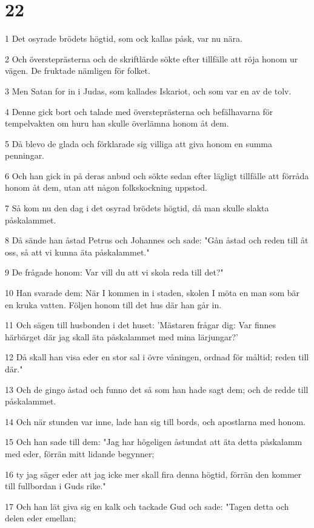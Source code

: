 \chapter{22}

\par 1 Det osyrade brödets högtid, som ock kallas påsk, var nu nära.
\par 2 Och översteprästerna och de skriftlärde sökte efter tillfälle att röja honom ur vägen. De fruktade nämligen för folket.
\par 3 Men Satan for in i Judas, som kallades Iskariot, och som var en av de tolv.
\par 4 Denne gick bort och talade med översteprästerna och befälhavarna för tempelvakten om huru han skulle överlämna honom åt dem.
\par 5 Då blevo de glada och förklarade sig villiga att giva honom en summa penningar.
\par 6 Och han gick in på deras anbud och sökte sedan efter lägligt tillfälle att förråda honom åt dem, utan att någon folkskockning uppstod.
\par 7 Så kom nu den dag i det osyrad brödets högtid, då man skulle slakta påskalammet.
\par 8 Då sände han åstad Petrus och Johannes och sade: "Gån åstad och reden till åt oss, så att vi kunna äta påskalammet."
\par 9 De frågade honom: Var vill du att vi skola reda till det?"
\par 10 Han svarade dem: När I kommen in i staden, skolen I möta en man som bär en kruka vatten. Följen honom till det hus där han går in.
\par 11 Och sägen till husbonden i det huset: 'Mästaren frågar dig: Var finnes härbärget där jag skall äta påskalammet med mina lärjungar?'
\par 12 Då skall han visa eder en stor sal i övre våningen, ordnad för måltid; reden till där."
\par 13 Och de gingo åstad och funno det så som han hade sagt dem; och de redde till påskalammet.
\par 14 Och när stunden var inne, lade han sig till bords, och apostlarna med honom.
\par 15 Och han sade till dem: "Jag har högeligen åstundat att äta detta påskalamm med eder, förrän mitt lidande begynner;
\par 16 ty jag säger eder att jag icke mer skall fira denna högtid, förrän den kommer till fullbordan i Guds rike."
\par 17 Och han lät giva sig en kalk och tackade Gud och sade: "Tagen detta och delen eder emellan;
